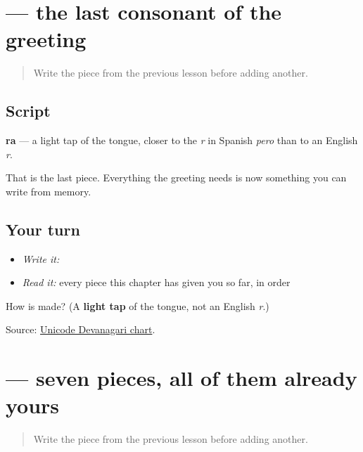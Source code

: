 \section[ra]{ — the last consonant of the greeting}

\label{lesson:MR-W01-ra}



\begin{quote}
Write the piece from the previous lesson before adding another.
\end{quote}

\subsection*{Script}
\begin{quote}
\end{quote}

\textbf{ra} — a light tap of the tongue, closer to the \emph{r} in Spanish \emph{pero} than to an English \emph{r}.

That is the last piece. Everything the greeting needs is now something you can write from memory.

\subsection*{Your turn}
\begin{itemize}
\raggedright
  \item \emph{Write it:} 
  \item \emph{Read it:} every piece this chapter has given you so far, in order
\end{itemize}

\begin{tcolorbox}[breakable,colback=teal!4,colframe=teal!35!black,title={Before you move on}]
How is \textbf{} made? (A \textbf{light tap} of the tongue, not an English \emph{r}.)

Source: \href{https://www.unicode.org/charts/PDF/U0900.pdf}{Unicode Devanagari chart}.
\end{tcolorbox}
\section[namaskār]{ — seven pieces, all of them already yours}

\label{lesson:MR-W01-namaskar-read}



\begin{quote}
Write the piece from the previous lesson before adding another.
\end{quote}

